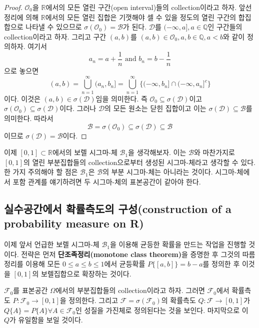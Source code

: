 \documentclass[b5paper,]{scrbook}
\theoremstyle{plain}
\theoremstyle{definition}
\numberwithin{equation}{section}
\let\BeginKnitrBlock\begin \let\EndKnitrBlock\end
\begin{document}
\BeginKnitrBlock{proof}
{}\(\mathcal{O}_{0}\)을 \(\mathbb{R}\)에서의
모든 열린 구간(open interval)들의 collection이라고 하자. 앞선 정리에
의해 \(\mathbb{R}\)에서의 모든 열린 집합은 기껏해야 셀 수 있을 정도의
열린 구간의 합집합으로 나타낼 수 있으므로
\(\sigma(\mathcal{O}_{0})=\mathcal{B}\)가 된다. \(\mathcal{D}\)를
\((-\infty, a], a\in \mathbb{Q}\)인 구간들의 collection이라고 하자.
그리고 구간 \((a,b)\)를
\((a,b)\in \mathcal{O}_{0}, a,b \in \mathbb{Q}, a<b\)와 같이 정의하자.
여기서 \[a_{n}=a+\frac{1}{n} \text{ and } b_{n}=b-\frac{1}{n}\] 으로
놓으면
\[(a,b)=\bigcup_{n=1}^{\infty}(a_{n},b_{n}]=\bigcup_{n=1}^{\infty}\{ (-\infty, b_{n}] \cap (-\infty, a_{n}]^{c}\}\]
이다. 이것은 \((a,b)\in \sigma (\mathcal{D})\)임을 의미한다. 즉
\(\mathcal{O}_{0}\subseteq \sigma(\mathcal{D})\)이고
\(\sigma(\mathcal{O}_{0})\subseteq \sigma(\mathcal{D})\)이다. 그러나
\(\mathcal{D}\)의 모든 원소는 닫힌 집합이고 이는
\(\sigma(\mathcal{D})\subseteq \mathcal{B}\)를 의미한다. 따라서
\[\mathcal{B} = \sigma(\mathcal{O}_{0})\subseteq \sigma(\mathcal{D})\subseteq \mathcal{B}\]
이므로 \(\sigma(\mathcal{D})=\mathcal{B}\)이다.
\EndKnitrBlock{proof}

이제 \([0,1]\subset \mathbb{R}\)에서의 보렐 시그마-체
\(\mathcal{B}_{1}\)을 생각해보자. 이는 \(\mathcal{B}\)와 마찬가지로
\([0,1]\)의 열린 부분집합들의 collection으로부터 생성된 시그마-체라고
생각할 수 있다. 한 가지 주의해야 할 점은 \(\mathcal{B}_{1}\)은
\(\mathcal{B}\)의 부분 시그마-체는 아니라는 것이다. 시그마-체에서 포함
관계를 얘기하려면 두 시그마-체의 표본공간이 같아야 한다.

\subsection{실수공간에서 확률측도의 구성(construction of a probability
measure on R)}\label{--construction-of-a-probability-measure-on-r}

이제 앞서 언급한 보렐 시그마-체 \(\mathcal{B}_{1}\)을 이용해 균등한
확률을 만드는 작업을 진행할 것이다. 전략은 먼저
\textbf{단조족정리(monotone class theorem)}을 증명한 후 그것의
따름정리를 이용해 모든 \(0\leq a \leq b \leq 1\)에서 균등확률
\(P\{[a,b]\}=b-a\)를 정의한 후 이것을 \([0,1]\)의 보렐집합으로 확장하는
것이다.

\(\mathcal{F}_{0}\)를 표본공간 \(\Omega\)에서의 부분집합들의
collection이라고 하자. 그러면 \(\mathcal{F}_{0}\)에서 확률측도
\(P:\mathcal{F}_{0} \rightarrow [0,1]\)을 정의한다. 그리고
\(\mathcal{F}=\sigma(\mathcal{F}_{0})\)의 확률측도
\(Q:\mathcal{F} \rightarrow [0,1]\)가
\(Q\{A\}=P\{A\} \forall A\in \mathcal{F}_{0}\)인 성질을 가진체로
정의된다는 것을 보인다. 마지막으로 이 \(Q\)가 유일함을 보일 것이다.
\end{document}
